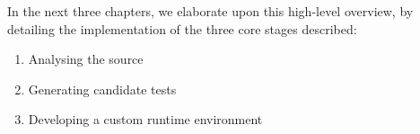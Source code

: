 
In the next three chapters, we elaborate upon this high-level overview, by detailing the implementation of the three core stages described:

\begin{enumerate}
   \item Analysing the source
   \item Generating candidate tests
   \item Developing a custom runtime environment
\end{enumerate}